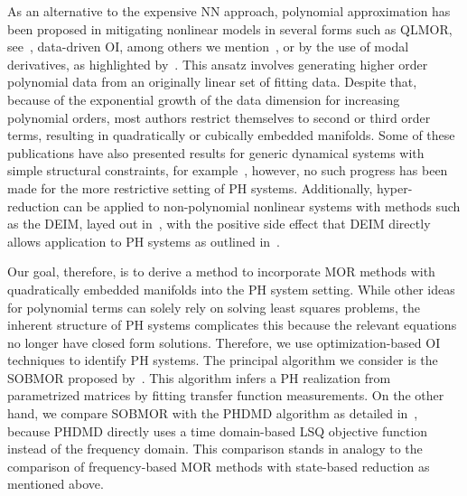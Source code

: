 As an alternative to the expensive \ac{NN} approach, polynomial approximation has been proposed in mitigating nonlinear models in several forms such as QLMOR, see~\cite{Gu2011}, data-driven \ac{OI}, among others we mention~\cite{Peherstorfer2016, Kramer2019, BGK2020, Qian2022, Geelen2023, Sharma2023}, or by the use of modal derivatives, as highlighted by~\cite{Jain2017, Rutzmoser2017}.
This ansatz involves generating higher order polynomial data from an originally linear set of fitting data.
Despite that, because of the exponential growth of the data dimension for increasing polynomial orders, most authors restrict themselves to second or third order terms, resulting in quadratically or cubically embedded manifolds.
Some of these publications have also presented results for generic dynamical systems with simple structural constraints, for example~\cite{BGH2020, Qian2020, Gosea2021, Khodabakhshi2022}, however, no such progress has been made for the more restrictive setting of \ac{PH} systems.
Additionally, hyper-reduction can be applied to non-polynomial nonlinear systems with methods such as the \ac{DEIM}, layed out in~\cite{Chaturantabut2010}, with the positive side effect that \ac{DEIM} directly allows application to \ac{PH} systems as outlined in~\cite{Chaturantabut2016}.

Our goal, therefore, is to derive a method to incorporate \ac{MOR} methods with quadratically embedded manifolds into the \ac{PH} system setting.
While other ideas for polynomial terms can solely rely on solving least squares problems, the inherent structure of \ac{PH} systems complicates this because the relevant equations no longer have closed form solutions.
Therefore, we use optimization-based \ac{OI} techniques to identify \ac{PH} systems.
The principal algorithm we consider is the \ac{SOBMOR} proposed by~\cite{SV2023}.
This algorithm infers a \ac{PH} realization from parametrized matrices by fitting transfer function measurements.
On the other hand, we compare \ac{SOBMOR} with the \ac{PHDMD} algorithm as detailed in~\cite{Morandin2023}, because \ac{PHDMD} directly uses a time domain-based \ac{LSQ} objective function instead of the frequency domain.
This comparison stands in analogy to the comparison of frequency-based \ac{MOR} methods with state-based reduction as mentioned above.

